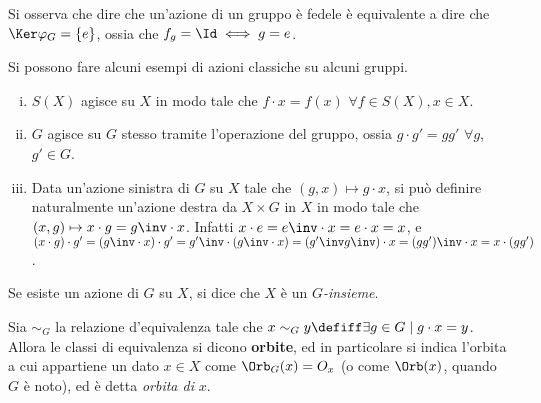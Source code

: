 \documentclass[11pt]{article}
\begin{document}
	\begin{remark}
		Si osserva che dire che un'azione di un gruppo è fedele è equivalente
		a dire che $\Ker \varphi_G = \{ e \}$, ossia che $f_g = \Id \iff g = e$.
	\end{remark}
	
	\begin{example}
		Si possono fare alcuni esempi di azioni classiche su alcuni gruppi.
		\begin{enumerate}[(i)]
			\item $S(X)$ agisce su $X$ in modo tale che $f \cdot x = f(x)$ $\forall f \in S(X), x \in X$.
			
			\item $G$ agisce su $G$ stesso tramite l'operazione del gruppo, ossia $g \cdot g' = gg'$ $\forall g$, $g' \in G$.
			
			\item Data un'azione sinistra di $G$ su $X$ tale che $(g, x) \mapsto g \cdot x$, si può definire
			naturalmente un'azione destra da $X \times G$ in $X$ in modo tale che $(x, g) \mapsto x \cdot g = g\inv \cdot x$.
			Infatti $x \cdot e = e\inv \cdot x = e \cdot x = x$, e $(x \cdot g) \cdot g' = (g\inv \cdot x) \cdot g' =
			{g'}\inv \cdot (g\inv \cdot x) = ({g'}\inv g\inv) \cdot x = (g g')\inv \cdot x = x \cdot (g g')$.
		\end{enumerate}
	\end{example}
	
	\begin{definition} [$G$-insieme]
		Se esiste un azione di $G$ su $X$, si dice che $X$ è un $G$\textit{-insieme}.
	\end{definition}
	
	\begin{definition} [orbita di $x$]
		Sia $\sim_G$ la relazione d'equivalenza tale che $x \sim_G y \defiff \exists g \in G \mid g \cdot x = y$.
		Allora le classi di equivalenza si dicono \textbf{orbite}, ed in particolare si indica l'orbita a cui
		appartiene un dato $x \in X$ come $\Orb_G(x) = O_x$ (o come $\Orb(x)$, quando $G$ è noto), ed è detta \textit{orbita di} $x$.
	\end{definition}
	
\end{document}
